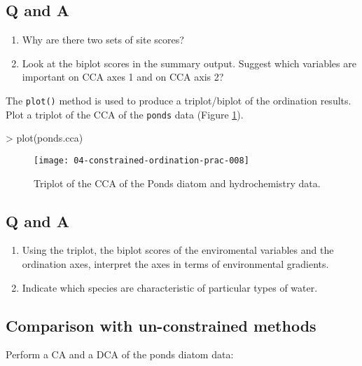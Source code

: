 \documentclass[a4paper,10pt]{article}
\begin{document}
\subsection*{Q and A}
\begin{enumerate}
\item Why are there two sets of site scores?
\item Look at the biplot scores in the summary output. Suggest which variables are important on CCA axes 1 and on CCA axis 2?
\end{enumerate}

The \texttt{plot()} method is used to produce a triplot/biplot of the ordination results. Plot a triplot of the CCA of the \texttt{ponds} data (Figure \ref{cca_triplot}).

\begin{Schunk}
\begin{Sinput}
> plot(ponds.cca)
\end{Sinput}
\end{Schunk}

\begin{figure}[t]
\begin{center}
\texttt{[image: 04-constrained-ordination-prac-008]}
\caption{\label{cca_triplot}Triplot of the CCA of the Ponds diatom and hydrochemistry data.}
\end{center}
\end{figure}

\subsection*{Q and A}
\begin{enumerate}
\item Using the triplot, the biplot scores of the enviromental variables and the ordination axes, interpret the axes in terms of environmental gradients.
\item Indicate which species are characteristic of particular types of water.
\end{enumerate}

\subsection{Comparison with un-constrained methods}
Perform a CA and a DCA of the ponds diatom data:
\end{document}
